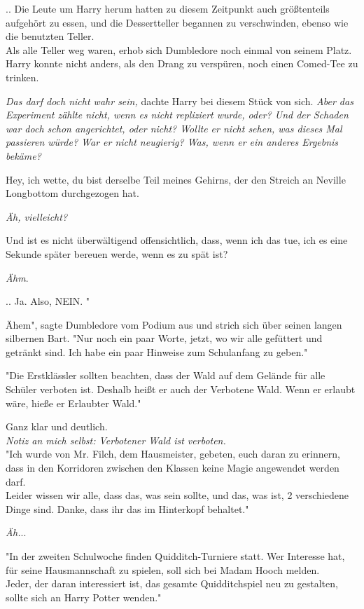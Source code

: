 {.. Die Leute um Harry herum hatten zu diesem Zeitpunkt auch größtenteils aufgehört zu essen, und die Dessertteller begannen zu verschwinden, ebenso wie die benutzten Teller.\\ Als alle Teller weg waren, erhob sich Dumbledore noch einmal von seinem Platz. Harry konnte nicht anders, als den Drang zu verspüren, noch einen Comed-Tee zu trinken.

\emph{Das darf doch nicht wahr sein,} dachte Harry bei diesem Stück von sich. \emph{Aber das Experiment zählte nicht, wenn es nicht repliziert wurde, oder? Und der Schaden war doch schon angerichtet, oder nicht? Wollte er nicht sehen, was dieses Mal passieren würde? War er nicht neugierig? Was, wenn er ein anderes Ergebnis bekäme?}

Hey, ich wette, du bist derselbe Teil meines Gehirns, der den Streich an Neville Longbottom durchgezogen hat.

\emph{Äh, vielleicht?}

Und ist es nicht überwältigend offensichtlich, dass, wenn ich das tue, ich es eine Sekunde später bereuen werde, wenn es zu spät ist?

\emph{Ähm}.

.. Ja. Also, NEIN. "

Ähem", sagte Dumbledore vom Podium aus und strich sich über seinen langen silbernen Bart. "Nur noch ein paar Worte, jetzt, wo wir alle gefüttert und getränkt sind. Ich habe ein paar Hinweise zum Schulanfang zu geben."

"Die Erstklässler sollten beachten, dass der Wald auf dem Gelände für alle Schüler verboten ist. Deshalb heißt er auch der Verbotene Wald. Wenn er erlaubt wäre, hieße er Erlaubter Wald."

Ganz klar und deutlich.\\ \emph{Notiz an mich selbst: Verbotener Wald ist verboten.}\\ "Ich wurde von Mr. Filch, dem Hausmeister, gebeten, euch daran zu erinnern, dass in den Korridoren zwischen den Klassen keine Magie angewendet werden darf.\\ Leider wissen wir alle, dass das, was sein sollte, und das, was ist, 2 verschiedene Dinge sind. Danke, dass ihr das im Hinterkopf behaltet."

\emph{Äh.}..

"In der zweiten Schulwoche finden Quidditch-Turniere statt. Wer Interesse hat, für seine Hausmannschaft zu spielen, soll sich bei Madam Hooch melden.\\ Jeder, der daran interessiert ist, das gesamte Quidditchspiel neu zu gestalten, sollte sich an Harry Potter wenden."

}
